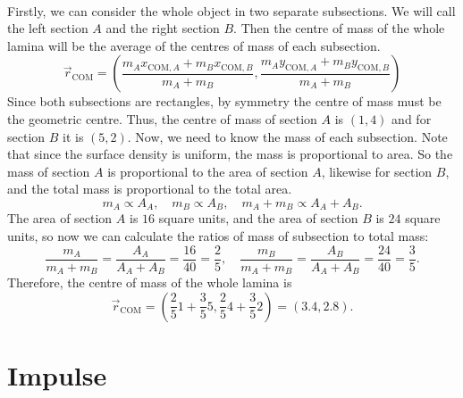 \documentclass[../classical_mechanics.tex]{subfiles}
\begin{document}
\begin{example}
            \paragraph{}
            Firstly, we can consider the whole object in two separate subsections.
            We will call the left section $A$ and the right section $B$.
            Then the centre of mass of the whole lamina will be the average of the centres of mass of each subsection.
            \begin{equation}
                \vec{r}_\text{COM}=\left(\frac{m_A x_{\text{COM},A}+m_B x_{\text{COM},B}}{m_A+m_B},\frac{m_A y_{\text{COM},A}+m_B y_{\text{COM},B}}{m_A+m_B}\right)
            \end{equation}
            Since both subsections are rectangles, by symmetry the centre of mass must be the geometric centre.
            Thus, the centre of mass of section $A$ is $(1,4)$ and for section $B$ it is $(5,2)$.
            Now, we need to know the mass of each subsection.
            Note that since the surface density is uniform, the mass is proportional to area.
            So the mass of section $A$ is proportional to the area of section $A$, likewise for section $B$, and the total mass is proportional to the total area.
            \begin{equation}
                m_A\propto A_A,\quad m_B\propto A_B,\quad m_A+m_B\propto A_A+A_B.
            \end{equation}
            The area of section $A$ is $16$ square units, and the area of section $B$ is $24$ square units, so now we can calculate the ratios of mass of subsection to total mass:
            \begin{equation}
                \frac{m_A}{m_A+m_B}=\frac{A_A}{A_A+A_B}=\frac{16}{40}=\frac{2}{5},\quad\frac{m_B}{m_A+m_B}=\frac{A_B}{A_A+A_B}=\frac{24}{40}=\frac{3}{5}.
            \end{equation}
            Therefore, the centre of mass of the whole lamina is
            \begin{equation}
                \vec{r}_\text{COM}=\left(\frac{2}{5}1+\frac{3}{5}5,\frac{2}{5}4+\frac{3}{5}2\right)=(3.4,2.8).
            \end{equation}
        \end{example}

    \section{Impulse}\label{sec:impulse}
\end{document}

